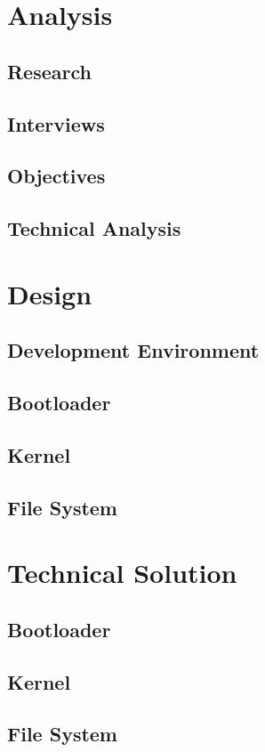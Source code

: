 \documentclass{article}
\begin{document}

\tableofcontents
\newpage

\section{Analysis}
\subsection{Research}
\subsection{Interviews}
\subsection{Objectives}
\subsection{Technical Analysis}

\section{Design}
\subsection{Development Environment}
\subsection{Bootloader}
\subsection{Kernel}
\subsection{File System}

\section{Technical Solution}
\subsection{Bootloader}
\subsection{Kernel}
\subsection{File System}
\end{document}
